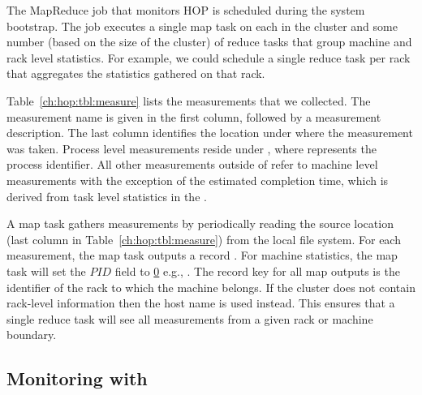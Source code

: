 The MapReduce job that monitors HOP is scheduled during the system bootstrap.
The job executes a single map task on each \TT in the cluster and some
number (based on the size of the cluster) of reduce tasks that group machine
and rack level statistics.  For example, we could schedule a single reduce task
per rack that aggregates the statistics gathered on that rack.

Table~\ref{ch:hop:tbl:measure} lists the measurements that we collected.  The
measurement name is given in the first column, followed by a measurement
description.  The last column identifies the location under  where
the measurement was taken.  Process level measurements reside under
, where \ol{[pid]} represents the process identifier.  All
other measurements outside of  refer to machine level
measurements with the exception of the estimated completion time, which is
derived from task level statistics in the \JT.

A map task gathers measurements by periodically reading the source location
(last column in Table~\ref{ch:hop:tbl:measure}) from the local file system.
For each measurement, the map task outputs a record .  For machine statistics, the map
task will set the $PID$ field to {\underline 0} e.g.,
.  The
record key for all map outputs is the identifier of the rack to which the
machine belongs.  If the cluster does not contain rack-level information then
the host name is used instead.  This ensures that a single reduce task will see
all measurements from a given rack or machine boundary.

\subsection{Monitoring with \OVERLOG}

